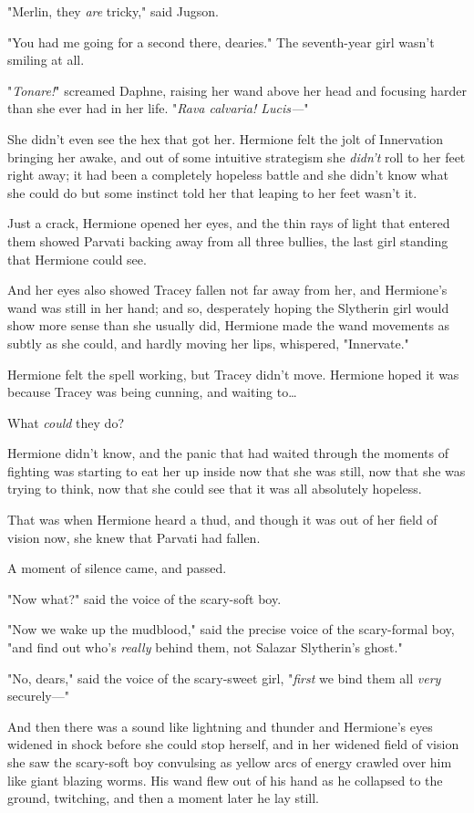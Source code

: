 "Merlin, they \emph{are} tricky," said Jugson.

"You had me going for a second there, dearies." The seventh-year girl wasn't 
smiling at all.

"\emph{Tonare!}" screamed Daphne, raising her wand above her head and focusing 
harder than she ever had in her life. "\emph{Rava calvaria! Lucis---}"

She didn't even see the hex that got her.
\sbreak
Hermione felt the jolt of Innervation bringing her awake, and out of some 
intuitive strategism she \emph{didn't} roll to her feet right away; it had been 
a completely hopeless battle and she didn't know what she could do but some 
instinct told her that leaping to her feet wasn't it.

Just a crack, Hermione opened her eyes, and the thin rays of light that entered 
them showed Parvati backing away from all three bullies, the last girl standing 
that Hermione could see.

And her eyes also showed Tracey fallen not far away from her, and Hermione's 
wand was still in her hand; and so, desperately hoping the Slytherin girl would 
show more sense than she usually did, Hermione made the wand movements as 
subtly as she could, and hardly moving her lips, whispered, "Innervate."

Hermione felt the spell working, but Tracey didn't move. Hermione hoped it was 
because Tracey was being cunning, and waiting to{\ldots}

What \emph{could} they do?

Hermione didn't know, and the panic that had waited through the moments of 
fighting was starting to eat her up inside now that she was still, now that she 
was trying to think, now that she could see that it was all absolutely hopeless.

That was when Hermione heard a thud, and though it was out of her field of 
vision now, she knew that Parvati had fallen.

A moment of silence came, and passed.

"Now what?" said the voice of the scary-soft boy.

"Now we wake up the mudblood," said the precise voice of the scary-formal boy, 
"and find out who's \emph{really} behind them, not Salazar Slytherin's ghost."

"No, dears," said the voice of the scary-sweet girl, "\emph{first} we bind them 
all \emph{very} securely---"

And then there was a sound like lightning and thunder and Hermione's eyes 
widened in shock before she could stop herself, and in her widened field of 
vision she saw the scary-soft boy convulsing as yellow arcs of energy crawled 
over him like giant blazing worms. His wand flew out of his hand as he 
collapsed to the ground, twitching, and then a moment later he lay still.

